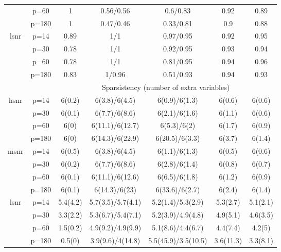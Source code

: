 \begin{table}[ht]
{\begin{tabular}{|c|c|ccccc|}
   & p=60 & 1 & 0.56/0.56 & 0.6/0.83 & 0.92 & 0.89 \\ 
   & p=180 & 1 & 0.47/0.46 & 0.33/0.81 & 0.9 & 0.88 \\ 
  \midrule\multirow{4}[2]{*}{lsnr} & p=14 & 0.89 & 1/1 & 0.97/0.95 & 0.92 & 0.95 \\ 
   & p=30 & 0.78 & 1/1 & 0.92/0.95 & 0.93 & 0.94 \\ 
   & p=60 & 0.78 & 1/1 & 0.81/0.95 & 0.94 & 0.96 \\ 
   & p=180 & 0.83 & 1/0.96 & 0.51/0.93 & 0.94 & 0.93 \\ 
   \midrule 
 \multicolumn{1}{|c}{} &       & \multicolumn{5}{c|}{Sparsistency (number of extra variables)} \\
\midrule\multirow{4}[2]{*}{hsnr} & p=14 & 6(0.2) & 6(3.8)/6(4.5) & 6(0.9)/6(1.3) & 6(0.6) & 6(0.6) \\ 
   & p=30 & 6(0.1) & 6(7.7)/6(8.6) & 6(2.1)/6(1.6) & 6(1.1) & 6(0.6) \\ 
   & p=60 & 6(0) & 6(11.1)/6(12.7) & 6(5.3)/6(2) & 6(1.7) & 6(0.9) \\ 
   & p=180 & 6(0) & 6(14.3)/6(22.9) & 6(20.5)/6(3.3) & 6(3.7) & 6(1.4) \\ 
  \midrule\multirow{4}[2]{*}{msnr} & p=14 & 6(0.5) & 6(3.8)/6(4.5) & 6(1.1)/6(1.3) & 6(0.5) & 6(0.6) \\ 
   & p=30 & 6(0.2) & 6(7.7)/6(8.6) & 6(2.8)/6(1.4) & 6(0.8) & 6(0.7) \\ 
   & p=60 & 6(0.1) & 6(11.1)/6(12.6) & 6(6.5)/6(1.8) & 6(1.2) & 6(0.9) \\ 
   & p=180 & 6(0.1) & 6(14.3)/6(23) & 6(33.6)/6(2.7) & 6(2.4) & 6(1.4) \\ 
  \midrule\multirow{4}[2]{*}{lsnr} & p=14 & 5.4(4.2) & 5.7(3.5)/5.7(4.1) & 5.2(1.4)/5.3(2.9) & 5.3(2.7) & 5.1(2.1) \\ 
   & p=30 & 3.3(2.2) & 5.3(6.7)/5.4(7.1) & 5.2(3.9)/4.9(4.8) & 4.9(5.1) & 4.6(3.5) \\ 
   & p=60 & 1.5(0.2) & 4.9(9.2)/4.9(9.9) & 5.1(8.6)/4.4(6.7) & 4.4(7.4) & 4.2(5) \\ 
   & p=180 & 0.5(0) & 3.9(9.6)/4(14.8) & 5.5(45.9)/3.5(10.5) & 3.6(11.3) & 3.3(8.1) \\ 
   \bottomrule 
\end{tabular}
}
\end{table}

